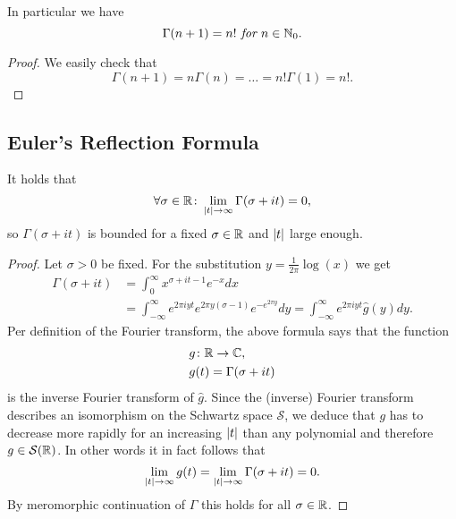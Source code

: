 \begin{lemma}
	In particular we have
\begin{equation*}
	\Gamma(n + 1) = n! \textit{ for } n \in \mathbb{N}_0.
\end{equation*}
\end{lemma}
\begin{proof}
	We easily check that
\begin{equation*}
	\Gamma(n + 1) = n \Gamma(n) = \dots = n! \Gamma(1) = n!.
\end{equation*}
\end{proof}


\subsection{Euler's Reflection Formula}


\begin{lemma}
	It holds that
\begin{equation*}
	\forall \sigma \in \mathbb{R} \colon \lim\limits_{\left|t\right| \to \infty} \Gamma(\sigma + i t) = 0,
\end{equation*}
	so $\Gamma(\sigma + i t)$ is bounded for a fixed $\sigma \in \mathbb{R}$ and $\left|t\right|$ large enough.
\end{lemma}
\begin{proof}
	Let $\sigma >0$ be fixed. For the substitution $y = \frac{1}{2 \pi} \log(x)$ we get
\begin{equation*}
\begin{aligned}	
	\Gamma(\sigma + i t)
	&= \int_0^\infty x^{\sigma + i t - 1} e^{-x} dx \\
	&= \int_{-\infty}^\infty e^{2 \pi i y t} e^{2 \pi y (\sigma - 1)} e^{-e^{2 \pi y}} dy = \int_{-\infty}^\infty e^{2 \pi i y t} \hat{g}(y) dy.
\end{aligned}
\end{equation*}
	Per definition of the Fourier transform, the above formula says that the function
\begin{equation*}
\begin{aligned}
	&g\colon \mathbb{R} \to \mathbb{C}, \\
	&g(t) = \Gamma(\sigma + i t)
\end{aligned}
\end{equation*}
	is the inverse Fourier transform of $\hat{g}$. Since the (inverse) Fourier transform describes an isomorphism on the Schwartz space $\mathcal{S}$, we deduce that $g$ has to decrease more rapidly for an increasing $\left|t\right|$ than any polynomial and therefore $g \in \mathcal{S}(\mathbb{R})$. In other words it in fact follows that
\begin{equation*}
	\lim\limits_{\left|t\right| \to \infty} g(t) = \lim\limits_{\left|t\right| \to \infty} \Gamma(\sigma + i t) = 0.
\end{equation*}
	By meromorphic continuation of $\Gamma$ this holds for all $\sigma \in \mathbb{R}$.
\end{proof}


